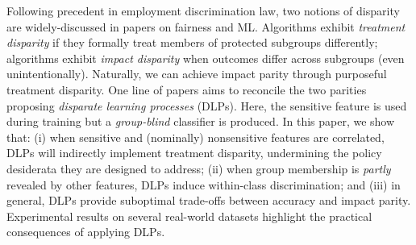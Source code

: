 Following precedent in employment discrimination law,
two notions of disparity are widely-discussed 
in papers on fairness and ML. 
Algorithms exhibit \emph{treatment disparity}
if they formally treat 
members of protected subgroups differently;
algorithms exhibit \emph{impact disparity}
when outcomes differ across subgroups (even unintentionally).
Naturally, we can achieve impact parity 
through purposeful treatment disparity.
One line of papers aims to reconcile the two parities
proposing \emph{disparate learning processes} (DLPs).
Here, the sensitive feature is used during training 
but a \emph{group-blind} classifier is produced.
In this paper, we show that:
(i) when sensitive and (nominally) nonsensitive features are correlated,
DLPs will indirectly implement treatment disparity,
undermining the policy desiderata 
they are designed to address;
(ii) when group membership is \emph{partly} revealed by other features, DLPs induce within-class discrimination;
and (iii) in general, DLPs provide suboptimal trade-offs between accuracy and impact parity.
Experimental results on several real-world datasets 
highlight the practical consequences 
of applying DLPs. 

